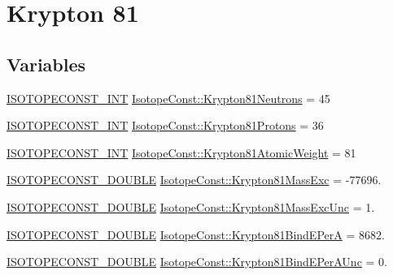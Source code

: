 \hypertarget{group___isotope_const-_krypton-_kr81}{}\section{Krypton 81}
\label{group___isotope_const-_krypton-_kr81}
\subsection*{Variables}
\begin{DoxyCompactItemize}
\item 
\mbox{\hyperlink{group___isotope_const-_macros_ga5f18360b3e99483a35c32d789e62621c}{I\+S\+O\+T\+O\+P\+E\+C\+O\+N\+S\+T\+\_\+\+I\+NT}} \mbox{\hyperlink{group___isotope_const-_krypton-_kr81_ga371c2c44c24ed7a68563188131ff343c}{Isotope\+Const\+::\+Krypton81\+Neutrons}} = 45
\item 
\mbox{\hyperlink{group___isotope_const-_macros_ga5f18360b3e99483a35c32d789e62621c}{I\+S\+O\+T\+O\+P\+E\+C\+O\+N\+S\+T\+\_\+\+I\+NT}} \mbox{\hyperlink{group___isotope_const-_krypton-_kr81_gaa2b19548bb97492fd10bbd0422469759}{Isotope\+Const\+::\+Krypton81\+Protons}} = 36
\item 
\mbox{\hyperlink{group___isotope_const-_macros_ga5f18360b3e99483a35c32d789e62621c}{I\+S\+O\+T\+O\+P\+E\+C\+O\+N\+S\+T\+\_\+\+I\+NT}} \mbox{\hyperlink{group___isotope_const-_krypton-_kr81_ga9f7b675861fd1487010622ee74c86292}{Isotope\+Const\+::\+Krypton81\+Atomic\+Weight}} = 81
\item 
\mbox{\hyperlink{group___isotope_const-_macros_ga8f45a7272ce02c0b4c65c44636ed719a}{I\+S\+O\+T\+O\+P\+E\+C\+O\+N\+S\+T\+\_\+\+D\+O\+U\+B\+LE}} \mbox{\hyperlink{group___isotope_const-_krypton-_kr81_gae06f0f664452e0daca8587cdd5ce15c2}{Isotope\+Const\+::\+Krypton81\+Mass\+Exc}} = -\/77696.
\item 
\mbox{\hyperlink{group___isotope_const-_macros_ga8f45a7272ce02c0b4c65c44636ed719a}{I\+S\+O\+T\+O\+P\+E\+C\+O\+N\+S\+T\+\_\+\+D\+O\+U\+B\+LE}} \mbox{\hyperlink{group___isotope_const-_krypton-_kr81_ga82e0ec29bce55b3cfced580b6084cc2c}{Isotope\+Const\+::\+Krypton81\+Mass\+Exc\+Unc}} = 1.
\item 
\mbox{\hyperlink{group___isotope_const-_macros_ga8f45a7272ce02c0b4c65c44636ed719a}{I\+S\+O\+T\+O\+P\+E\+C\+O\+N\+S\+T\+\_\+\+D\+O\+U\+B\+LE}} \mbox{\hyperlink{group___isotope_const-_krypton-_kr81_ga803029b8d6a68431e713ce42d0d8493c}{Isotope\+Const\+::\+Krypton81\+Bind\+E\+PerA}} = 8682.
\item 
\mbox{\hyperlink{group___isotope_const-_macros_ga8f45a7272ce02c0b4c65c44636ed719a}{I\+S\+O\+T\+O\+P\+E\+C\+O\+N\+S\+T\+\_\+\+D\+O\+U\+B\+LE}} \mbox{\hyperlink{group___isotope_const-_krypton-_kr81_gaafb38bea9dfce500e7da635f4dd94ce6}{Isotope\+Const\+::\+Krypton81\+Bind\+E\+Per\+A\+Unc}} = 0.

\end{DoxyCompactItemize}
